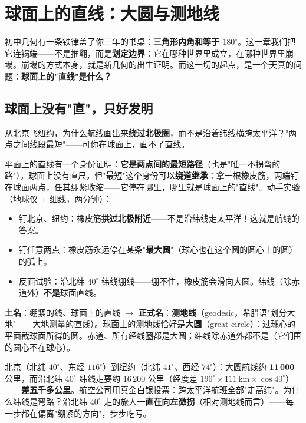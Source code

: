 \chapter{球面上的直线：大圆与测地线}

初中几何有一条铁律盖了你三年的书桌：\textbf{三角形内角和等于 $180^\circ$}。这一章我们把它连锅端——不是推翻，而是\textbf{划定边界}：它在哪种世界里成立，在哪种世界里崩塌。崩塌的方式本身，就是新几何的出生证明。而这一切的起点，是一个天真的问题：\textbf{球面上的"直线"是什么？}

\section{球面上没有"直"，只好发明}

\begin{kaiwei}
从北京飞纽约，为什么航线画出来\textbf{绕过北极圈}，而不是沿着纬线横跨太平洋？"两点之间线段最短"——可你在球面上，画不了直线。
\end{kaiwei}

平面上的直线有一个身份证明：\textbf{它是两点间的最短路径}（也是"唯一不拐弯的路"）。球面上没有直尺，但"最短"这个身份可以\textbf{绕道继承}：拿一根橡皮筋，两端钉在球面两点，任其绷紧收缩——它停在哪里，哪里就是球面上的"直线"。动手实验（地球仪 + 细线，两分钟）：

\begin{itemize}
\item 钉北京、纽约：橡皮筋\textbf{拱过北极附近}——不是沿纬线走太平洋！这就是航线的答案。
\item 钉任意两点：橡皮筋永远停在某条"\textbf{最大圆}"（球心也在这个圆的圆心上的圆）的弧上。
\item 反面试验：沿北纬 $40^\circ$ 纬线绷线——绷不住，橡皮筋会滑向大圆。纬线（除赤道外）\textbf{不是}球面直线。
\end{itemize}

\begin{faming}
\textbf{土名}：绷紧的线、球面上的直线 $\to$ \textbf{正式名}：\textbf{测地线}（geodesic，希腊语"划分大地"——大地测量的直线）。球面上的测地线恰好是\textbf{大圆}（great circle）：过球心的平面截球面所得的圆。赤道、所有经线圈都是大圆；纬线除赤道外都不是（它们围的圆心不在球心）。
\end{faming}

北京（北纬 $40^\circ$、东经 $116^\circ$）到纽约（北纬 $41^\circ$、西经 $74^\circ$）：大圆航线约 \textbf{11\,000} 公里，而沿北纬 $40^\circ$ 纬线走要约 $16\,200$ 公里（经度差 $190^\circ\times111\,\text{km}\times\cos40^\circ$）——\textbf{差五千多公里}。航空公司用真金白银投票：跨太平洋航班全部"走高纬"。为什么纬线是弯路？沿北纬 $40^\circ$ 走的旅人\textbf{一直在向左微拐}（相对测地线而言）——每一步都在偏离"绷紧的方向"，步步吃亏。

